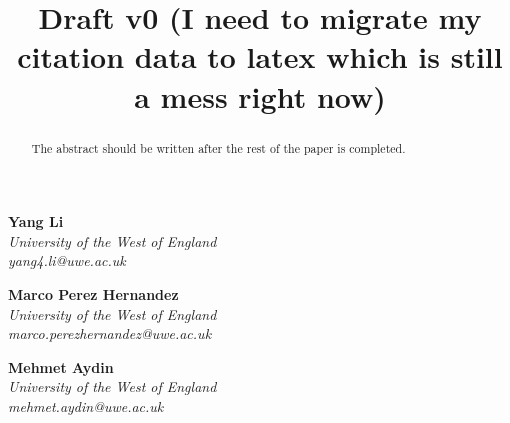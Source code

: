 \documentclass[a4paper]{article}
\title{
    \textbf{Draft v0 (I need to migrate my citation data to latex which is still a mess right now)} 
}
\date{} %
\begin{document}
\maketitle
\vspace{-1.5cm}

\begin{multicols}{3}
    \centering
    \textbf{Yang Li}\\
    \textit{University of the West of England}\\
    \textit{yang4.li@uwe.ac.uk}\\
    \vfill

    \textbf{Marco Perez Hernandez}\\
    \textit{University of the West of England}\\
    \textit{marco.perezhernandez@uwe.ac.uk}\\
    \vfill

    \textbf{Mehmet Aydin}\\
    \textit{University of the West of England}\\
    \textit{mehmet.aydin@uwe.ac.uk}\\
    \vfill
\end{multicols}

\singlespacing
\setlength{\parskip}{6pt}
\setlength{\parindent}{0.5cm}

\begin{abstract}
The abstract should be written after the rest of the paper is completed.
\end{abstract}
\end{document}

